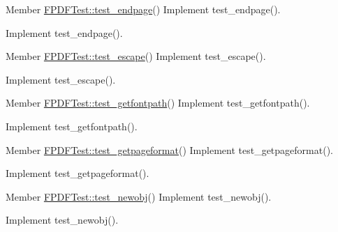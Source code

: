 \label{todo__todo000202}
\hypertarget{todo__todo000202}{}
 
\begin{DoxyDescription}
\item[Member \hyperlink{class_f_p_d_f_test_a4c7e35ee3eff1848468670a8fe0584f1}{FPDFTest::test\_\-endpage}() ]Implement test\_\-endpage().

Implement test\_\-endpage().
\end{DoxyDescription}

\label{todo__todo000203}
\hypertarget{todo__todo000203}{}
 
\begin{DoxyDescription}
\item[Member \hyperlink{class_f_p_d_f_test_ae48297271d11e1d52a1384855b89d3e9}{FPDFTest::test\_\-escape}() ]Implement test\_\-escape().

Implement test\_\-escape().
\end{DoxyDescription}

\label{todo__todo000200}
\hypertarget{todo__todo000200}{}
 
\begin{DoxyDescription}
\item[Member \hyperlink{class_f_p_d_f_test_a5e436f4b2f2a2d6c39aae8f5c7e8e17d}{FPDFTest::test\_\-getfontpath}() ]Implement test\_\-getfontpath().

Implement test\_\-getfontpath().
\end{DoxyDescription}

\label{todo__todo000199}
\hypertarget{todo__todo000199}{}
 
\begin{DoxyDescription}
\item[Member \hyperlink{class_f_p_d_f_test_a61571a1cdac74d176cf09b62f524a22f}{FPDFTest::test\_\-getpageformat}() ]Implement test\_\-getpageformat().

Implement test\_\-getpageformat().
\end{DoxyDescription}

\label{todo__todo000212}
\hypertarget{todo__todo000212}{}
 
\begin{DoxyDescription}
\item[Member \hyperlink{class_f_p_d_f_test_abbb3e91dda5b98c63b63c86840c9da28}{FPDFTest::test\_\-newobj}() ]Implement test\_\-newobj().

Implement test\_\-newobj().
\end{DoxyDescription}

\label{todo__todo000214}
\hypertarget{todo__todo000214}{}
 
